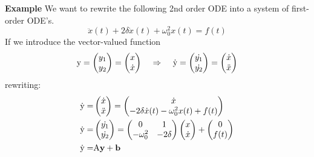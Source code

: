\textbf{Example}
We want to rewrite the following 2nd order ODE into a system of first-order ODE's.
\begin{equation}
  \ddot{x}(t) + 2\delta\dot{x}(t) + \omega_0^2x(t) = f(t)
\end{equation}
If we introduce the vector-valued function
\begin{equation}
  \textup{y} = \begin{pmatrix} y_1 \\ y_2 \end{pmatrix} =
                \begin{pmatrix} x \\ \dot{x} \end{pmatrix} \;\;\;\;  \Rightarrow \;\;\;\;
                \dot{\textup{y}} =
                \begin{pmatrix} \dot{y_1} \\ \dot{y_2} \end{pmatrix} =
                \begin{pmatrix} \dot{x} \\ \ddot{x} \end{pmatrix}
\end{equation}
rewriting:
\begin{equation}
  \begin{split}
      \dot{\textup{y}} =& \begin{pmatrix} \dot{x} \\ \ddot{x} \end{pmatrix} =
                          \begin{pmatrix} \dot{x} \\ -2\delta\dot{x}(t) - \omega_0^2x(t) + f(t) \end{pmatrix}\\
      \dot{\textup{y}} =& \begin{pmatrix} \dot{y_1} \\ \dot{y_2} \end{pmatrix} =
                          \begin{pmatrix} 0 & 1 \\ -\omega_0^2 & -2\delta \end{pmatrix}
                          \begin{pmatrix} x\\ \dot{x} \end{pmatrix} +
                          \begin{pmatrix} 0 \\ f(t) \end{pmatrix}\\
      \dot{\textup{y}} =& \textup{A}\textbf{y} + \mathbf{b}
  \end{split}
\end{equation}
